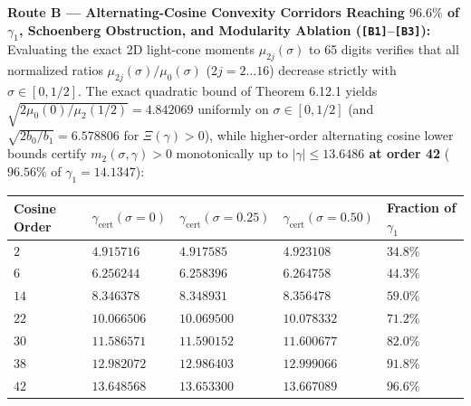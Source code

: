 \documentclass[
  11pt,
]{article}
\newcounter{none} %
\begin{document}
\begin{enumerate}
  \textbf{Route B --- Alternating-Cosine Convexity Corridors Reaching
  \(96.6\%\) of \(\gamma_1\), Schoenberg Obstruction, and Modularity
  Ablation (\texttt{{[}B1{]}}--\texttt{{[}B3{]}}):} Evaluating the exact
  2D light-cone moments \(\mu_{2j}(\sigma)\) to 65 digits verifies that
  all normalized ratios \(\mu_{2j}(\sigma)/\mu_0(\sigma)\)
  (\(2j = 2 \dots 16\)) decrease strictly with \(\sigma \in [0, 1/2]\).
  The exact quadratic bound of Theorem 6.12.1 yields
  \(\sqrt{2\mu_0(0)/\mu_2(1/2)} = 4.842069\) uniformly on
  \(\sigma \in [0, 1/2]\) (and \(\sqrt{2b_0/b_1} = 6.578806\) for
  \(\Xi(\gamma) > 0\)), while higher-order alternating cosine lower
  bounds certify \(m_2(\sigma, \gamma) > 0\) monotonically up to
  \textbf{\(|\gamma| \le 13.6486\) at order 42} (\(96.56\%\) of
  \(\gamma_1 = 14.1347\)):

  {\def\LTcaptype{none} %
  \begin{longtable}[]{@{}
    >{\centering\arraybackslash}p{}
    >{\centering\arraybackslash}p{}
    >{\centering\arraybackslash}p{}
    >{\centering\arraybackslash}p{}
    >{\centering\arraybackslash}p{}@{}}
  \toprule\noalign{}
  \begin{minipage}[b]{\linewidth}\centering
  Cosine Order
  \end{minipage} & \begin{minipage}[b]{\linewidth}\centering
  \(\gamma_{\text{cert}}(\sigma = 0)\)
  \end{minipage} & \begin{minipage}[b]{\linewidth}\centering
  \(\gamma_{\text{cert}}(\sigma = 0.25)\)
  \end{minipage} & \begin{minipage}[b]{\linewidth}\centering
  \(\gamma_{\text{cert}}(\sigma = 0.50)\)
  \end{minipage} & \begin{minipage}[b]{\linewidth}\centering
  Fraction of \(\gamma_1\)
  \end{minipage} \\
  \midrule\noalign{}
  \endhead
  \bottomrule\noalign{}
  \endlastfoot
  \(2\) & \(4.915716\) & \(4.917585\) & \(4.923108\) & \(34.8\%\) \\
  \(6\) & \(6.256244\) & \(6.258396\) & \(6.264758\) & \(44.3\%\) \\
  \(14\) & \(8.346378\) & \(8.348931\) & \(8.356478\) & \(59.0\%\) \\
  \(22\) & \(10.066506\) & \(10.069500\) & \(10.078332\) & \(71.2\%\) \\
  \(30\) & \(11.586571\) & \(11.590152\) & \(11.600677\) & \(82.0\%\) \\
  \(38\) & \(12.982072\) & \(12.986403\) & \(12.999066\) & \(91.8\%\) \\
  \textbf{\(42\)} & \textbf{\(13.648568\)} & \textbf{\(13.653300\)} &
  \textbf{\(13.667089\)} & \textbf{\(96.6\%\)} \\
  \end{longtable}
  }


\end{enumerate}
\end{document}
